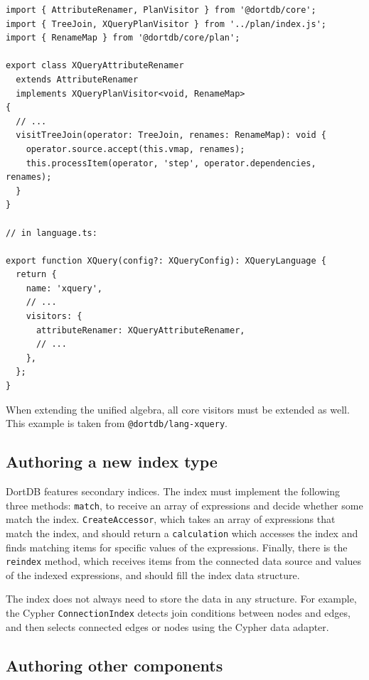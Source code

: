 \begin{listing}[!ht]
\begin{verbatim}
import { AttributeRenamer, PlanVisitor } from '@dortdb/core';
import { TreeJoin, XQueryPlanVisitor } from '../plan/index.js';
import { RenameMap } from '@dortdb/core/plan';

export class XQueryAttributeRenamer
  extends AttributeRenamer
  implements XQueryPlanVisitor<void, RenameMap>
{
  // ...
  visitTreeJoin(operator: TreeJoin, renames: RenameMap): void {
    operator.source.accept(this.vmap, renames);
    this.processItem(operator, 'step', operator.dependencies, renames);
  }
}

// in language.ts:

export function XQuery(config?: XQueryConfig): XQueryLanguage {
  return {
    name: 'xquery',
    // ...
    visitors: {
      attributeRenamer: XQueryAttributeRenamer,
      // ...
    },
  };
}
\end{verbatim}
\caption{When extending the unified algebra, all core visitors must be extended as well. This example is taken from \texttt{@dortdb/lang-xquery}.}
\end{listing}

\subsection{Authoring a new index type}

DortDB features secondary indices. The index must implement the following three methods: \texttt{match}, to receive an array of expressions and decide whether some match the index. \texttt{CreateAccessor}, which takes an array of expressions that match the index, and should return a \texttt{calculation} which accesses the index and finds matching items for specific values of the expressions. Finally, there is the \texttt{reindex} method, which receives items from the connected data source and values of the indexed expressions, and should fill the index data structure.

The index does not always need to store the data in any structure. For example, the Cypher \texttt{ConnectionIndex} detects join conditions between nodes and edges, and then selects connected edges or nodes using the Cypher data adapter.

\subsection{Authoring other components}

